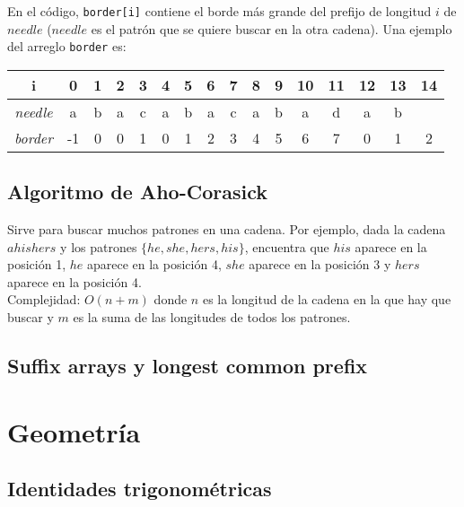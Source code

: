 \documentclass[10pt,letterpaper,twocolumn,twosided]{article}
\newcommand{\codigofuente}[1]{

\dotfill
}
\begin{document}
En el código, \verb_border[i]_ contiene el borde más grande del prefijo de longitud $i$ de $needle$ ($needle$
es el patrón que se quiere buscar en la otra cadena). Una ejemplo del arreglo \verb_border_ es: \\


\begin{center}
  \begin{tabular}{| c | c c c c c c c c c c c c c c c | }
    \hline
    i & 0 & 1 & 2 & 3 & 4 & 5 & 6 & 7 & 8 & 9 & 10 & 11 & 12 & 13 & 14 \\ [0.5ex]
    \hline
    \hline
    \textit{needle} & a & b & a & c & a & b & a & c & a & b & a & d & a & b & \\
    \textit{border} & -1 & 0 & 0 & 1 & 0 & 1 & 2 & 3 & 4 & 5 & 6 & 7 & 0 & 1 & 2 \\
    \hline
  \end{tabular}
\end{center}



\codigofuente{./src/strings/kmp.cpp}

\subsection{Algoritmo de Aho-Corasick}
Sirve para buscar muchos patrones en una cadena. Por ejemplo,
dada la cadena $ahishers$ y los patrones $\{he, she, hers, his\}$,
encuentra que $his$ aparece en la posición 1, $he$ aparece en la posición 4,
$she$ aparece en la posición 3 y $hers$ aparece en la posición 4. \\

Complejidad: $O(n + m)$ donde $n$ es la longitud de la cadena en la que hay que buscar
y $m$ es la suma de las longitudes de todos los patrones. \\

\codigofuente{./src/strings/aho-corasick.cpp}
\subsection{Suffix arrays y longest common prefix}
\codigofuente{./src/strings/suffix_arrays.cpp}

\section{Geometría}

\subsection{Identidades trigonométricas}
\end{document}
